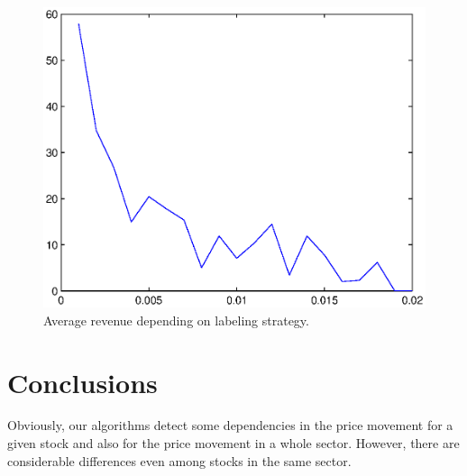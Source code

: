 \documentclass{llncs}
\begin{document}
\begin{figure}[htb!]
\caption{Average revenue depending on labeling strategy.}
\centering%
\includegraphics[scale=0.7]{revenue.eps}
\end{figure}

\section*{Conclusions}
Obviously, our algorithms detect some dependencies in the price movement for a given stock and also for the price movement in a whole sector. However, there are considerable differences even among stocks in the same sector.
\end{document}
